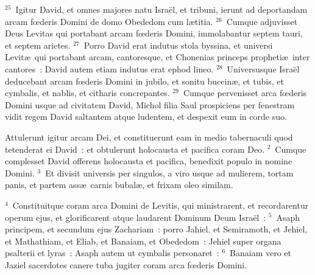 ${}^{25}$~Igitur David, et omnes majores natu Isra\"el, et tribuni, ierunt ad deportandam arcam fœderis Domini de domo Obededom cum l\ae titia.
${}^{26}$~Cumque adjuvisset Deus Levitas qui portabant arcam fœderis Domini, immolabantur septem tauri, et septem arietes.
${}^{27}$~Porro David erat indutus stola byssina, et universi Levit\ae\ qui portabant arcam, cantoresque, et Chonenias princeps propheti\ae\ inter cantores~: David autem etiam indutus erat ephod lineo.
${}^{28}$~Universusque Isra\"el deducebant arcam fœderis Domini in jubilo, et sonitu buccin\ae , et tubis, et cymbalis, et nablis, et citharis concrepantes.
${}^{29}$~Cumque pervenisset arca fœderis Domini usque ad civitatem David, Michol filia Saul prospiciens per fenestram vidit regem David saltantem atque ludentem, et despexit eum in corde suo.

\bchapter
\lettrine[lines=3,image=true,loversize=0.05,lraise=-0.03]{A}{}ttulerunt igitur arcam Dei, et constituerunt eam in medio tabernaculi quod tetenderat ei David~: et obtulerunt holocausta et pacifica coram Deo.
${}^{2}$~Cumque complesset David offerens holocausta et pacifica, benedixit populo in nomine Domini.
${}^{3}$~Et divisit universis per singulos, a viro usque ad mulierem, tortam panis, et partem ass\ae\ carnis bubal\ae , et frixam oleo similam.


${}^{4}$~Constituitque coram arca Domini de Levitis, qui ministrarent, et recordarentur operum ejus, et glorificarent atque laudarent Dominum Deum Isra\"el~:
${}^{5}$~Asaph principem, et secundum ejus Zachariam~: porro Jahiel, et Semiramoth, et Jehiel, et Mathathiam, et Eliab, et Banaiam, et Obededom~: Jehiel super organa psalterii et lyras~: Asaph autem ut cymbalis personaret~:
${}^{6}$~Banaiam vero et Jaziel sacerdotes canere tuba jugiter coram arca fœderis Domini.


